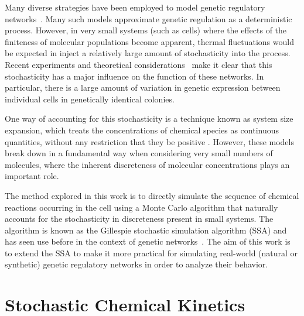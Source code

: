 \documentclass[english,letterpaper,12pt]{report}
\begin{document}
\begin{doublespacing}
Many diverse strategies have been employed to model genetic regulatory networks~\cite{review-in-numero}\cite{bistable-modeling}\cite{gillespie-ssa}\cite{langevin-limit}. Many such models  approximate genetic regulation as a deterministic process. However, in very small systems (such as cells) where the effects of the finiteness of molecular populations become apparent, thermal fluctuations would be expected in inject a relatively large amount of stochasticity into the process. Recent experiments and theoretical considerations~\cite{ecoli-decision}\cite{stoch-theories}\cite{stoch-single-cell} make it clear that this stochasticity has a major influence on the function of these networks. In particular, there is a large amount of variation in genetic expression between individual cells in genetically identical colonies.

One way of accounting for this stochasticity is a technique known as system size expansion, which treats the concentrations of chemical species as continuous quantities, without any restriction that they be positive . However, these models break down in a fundamental way when considering very small numbers of molecules, where the inherent discreteness of molecular concentrations plays an important role. 

The method explored in this work is to directly simulate the sequence of chemical reactions occurring in the cell using a Monte Carlo algorithm that naturally accounts for the stochasticity in discreteness present in small systems. The algorithm is known as the Gillespie stochastic simulation algorithm (SSA) and has seen use before in the context of genetic networks~\cite{we-chemkin}\cite{stoch-sys-bio}. The aim of this work is to extend the SSA to make it more practical for simulating real-world (natural or synthetic) genetic regulatory networks in order to analyze their behavior.


\section{Stochastic Chemical Kinetics} %
\label{sec:chemkin}


\end{doublespacing}
\end{document}
